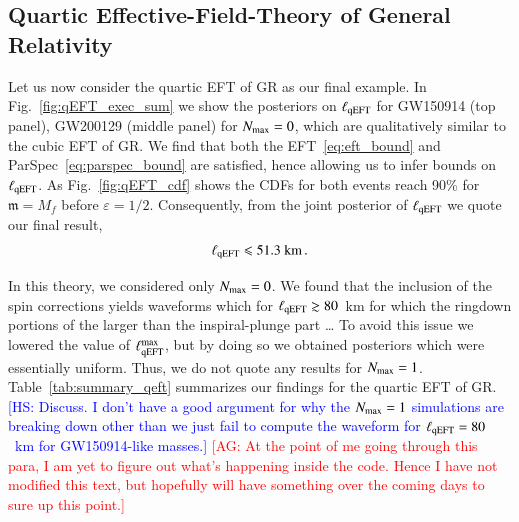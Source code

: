 \documentclass[twocolumn,
               prd,
               aps,
               superscriptaddress,
               tightenlines,
               nofootinbib,
               eqsecnum,
               amsfonts,
               amsmath,
               longbibliography]{revtex4-1}
\newcommand{\gm}{\mathfrak{m}}
\newcommand{\agcomm}[1]{{\textcolor{red}{{[AG: #1]}} }}
\newcommand{\hs}[1]{{\textcolor{blue}{{[HS: #1]}} }}
\begin{document}
\subsection{Quartic Effective-Field-Theory of General Relativity}
\label{sec:results_qeft}

Let us now consider the quartic EFT of GR as our final example.
%
In Fig.~\ref{fig:qEFT_exec_sum} we show the posteriors on $\ell_{\rm qEFT}$ for GW150914 (top panel),
GW200129 (middle panel) for $N_{\rm max} = 0$, which are qualitatively similar to the cubic EFT of GR.
%
We find that both the EFT~\eqref{eq:eft_bound} and ParSpec~\eqref{eq:parspec_bound} are satisfied,
hence allowing us to infer bounds on $\ell_{\rm qEFT}$.
%
As Fig.~\ref{fig:qEFT_cdf} shows the CDFs for both events reach 90\% for $\gm = M_f$ before $\varepsilon = 1/2$.
%
Consequently, from the joint posterior of $\ell_{\rm qEFT}$ we quote our final result,
%
\begin{equation}
    \ell_{\rm qEFT} \leqslant 51.3~\textrm{km}\,.
\end{equation}

In this theory, we considered only $N_{\rm max} = 0$. We found that the
inclusion of the spin corrections yields waveforms which for $\ell_{\rm qEFT} \gtrsim 80$~km
for which the ringdown portions of the larger than the inspiral-plunge part \dots
%
To avoid this issue we lowered the value of $\ell^{\rm max}_{\rm qEFT}$, but by doing so we obtained posteriors
which were essentially uniform. Thus, we do not quote any results for $N_{\rm max} = 1$.
%
Table~\ref{tab:summary_qeft} summarizes our findings for the quartic EFT of GR.
%
\hs{Discuss. I don't have a good argument for why the $N_{\rm max} = 1$ simulations are breaking down other than
we just fail to compute the waveform for $\ell_{\rm qEFT} = 80~$~km for GW150914-like masses.}
\agcomm{At the point of me going through this para, I am yet to figure out what's happening inside the code.
Hence I have not modified this text, but hopefully will have something over the coming days
to sure up this point.}
\end{document}
